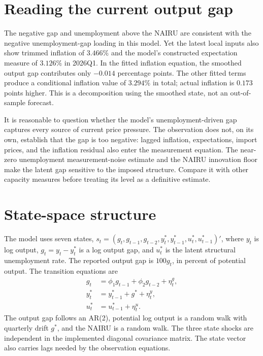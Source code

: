 \documentclass[11pt,a4paper]{article}
\newcommand{\NAIRU}{u^{*}}
\newcommand{\gap}{g}
\begin{document}
\clearpage

\section{Reading the current output gap}
The negative gap and unemployment above the NAIRU are consistent with the
negative unemployment-gap loading in this model. Yet the latest local inputs
also show trimmed inflation of $3.466\%$ and the model's constructed
expectation measure of $3.126\%$ in 2026Q1. In the fitted inflation equation,
the smoothed output gap contributes only $-0.014$ percentage points. The
other fitted terms produce a conditional inflation value of $3.294\%$ in
total; actual inflation is $0.173$ points higher. This is a decomposition
using the smoothed state, not an out-of-sample forecast.

It is reasonable to question whether the model's unemployment-driven gap
captures every source of current price pressure. The observation does not,
on its own, establish that the gap is too negative: lagged inflation,
expectations, import prices, and the inflation residual also enter the
measurement equation. The near-zero unemployment measurement-noise estimate
and the NAIRU innovation floor make the latent gap sensitive to the imposed
structure. Compare it with other capacity measures before treating its level
as a definitive estimate.

\section{State-space structure}
The model uses seven states,
$s_t=(\gap_t,\gap_{t-1},\gap_{t-2},y^*_t,y^*_{t-1},\NAIRU_t,\NAIRU_{t-1})'$, where
$y_t$ is log output, $\gap_t=y_t-y_t^*$ is a log output gap, and $\NAIRU_t$
is the latent structural unemployment rate. The reported output gap is
$100\gap_t$, in percent of potential output. The transition equations
are
\begin{align}
 \gap_t &= \phi_1\gap_{t-1}+\phi_2\gap_{t-2}+\eta^g_t,\\
 y_t^* &= y_{t-1}^*+g^*+\eta^y_t,\\
 \NAIRU_t &= \NAIRU_{t-1}+\eta^u_t.
\end{align}
The output gap follows an AR(2), potential log output is a random walk with
quarterly drift $g^*$, and the NAIRU is a random walk. The three state shocks
are independent in the implemented diagonal covariance matrix. The state
vector also carries lags needed by the observation equations.
\end{document}
